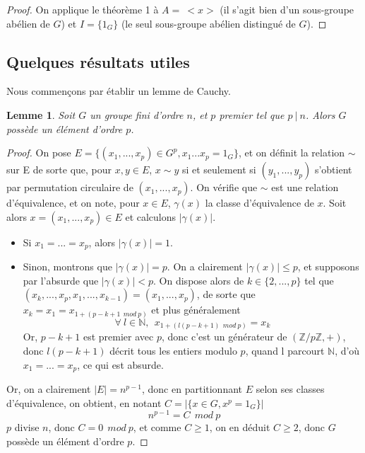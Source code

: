 \documentclass[10pt,a4paper]{article}
\newtheorem{lemma}{Lemme}
\begin{document}
\begin{proof}
    On applique le théorème 1 à $A=\:<x>$ (il s'agit bien d'un sous-groupe abélien de $G$) et $I=\{1_{G}\}$ (le seul sous-groupe abélien distingué de $G$).
\end{proof}

\subsection{Quelques résultats utiles}

Nous commençons par établir un lemme de Cauchy.
\begin{lemma}
    Soit $G$ un groupe fini d'ordre $n$, et $p$ premier tel que $p\: | \: n$. Alors $G$ possède un élément d'ordre $p$.
\end{lemma}

\begin{proof}
    On pose $E = \{(x_{1},...,x_{p}) \in G^{p}, x_{1}...x_{p} = 1_{G} \}$, et on définit la relation $\sim$ sur E de sorte que, pour $x,y \in E$, $x \sim y$ si et seulement si $(y_{1},...,y_{p})$ s'obtient par permutation circulaire de $(x_{1},...,x_{p})$. On vérifie que $\sim$ est une relation d'équivalence, et on note, pour $x \in E$, $\gamma (x)$ la classe d'équivalence de $x$. Soit alors $x=(x_{1},...,x_{p}) \in E$ et calculons $| \gamma (x)|$.

    \renewcommand{\labelitemi}{$-$}
    \begin{itemize}
        \item Si $x_{1} = ... = x_{p}$, alors $| \gamma (x) | = 1$.
        \item Sinon, montrons que $| \gamma (x) | = p$. On a clairement $| \gamma (x) | \leq p$, et supposons par l'absurde que $| \gamma (x) | < p$. On dispose alors de $k \in \{2,...,p\}$ tel que $(x_{k},...,x_{p},x_{1},...,x_{k-1})= (x_{1},...,x_{p})$, de sorte que $x_{k}=x_{1}=x_{1+(p-k+1 \:\: mod \: p)}$ et plus généralement
              $$ \forall \: l\in \mathbb{N}, \:\: x_{1+(l(p-k+1) \:\: mod \: p)}=x_{k}$$
              Or, $p-k+1$ est premier avec $p$, donc c'est un générateur de $(\mathbb{Z}/p\mathbb{Z},+)$, donc $l(p-k+1)$ décrit tous les entiers modulo $p$, quand l parcourt $\mathbb{N}$, d'où $x_{1}=...=x_{p}$, ce qui est absurde.
    \end{itemize}
    Or, on a clairement $|E|=n^{p-1}$, donc en partitionnant $E$ selon ses classes d'équivalence, on obtient, en notant $C=|\{x \in G,x^{p}=1_{G}\}|$
    $$n^{p-1} = C \:\: mod\: p$$
    $p$ divise $n$, donc $C = 0 \:\: mod \: p$, et comme $C\geq 1$, on en déduit $C\geq 2$, donc $G$ possède un élément d'ordre $p$.

\end{proof}
\end{document}
